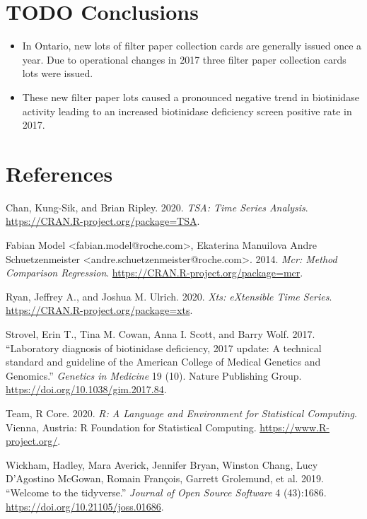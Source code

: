 \documentclass[review]{elsarticle}
\begin{document}
\section*{{\bfseries\sffamily TODO} Conclusions}
\label{sec:org73d0702}

\begin{itemize}
\item In Ontario, new lots of filter paper collection cards are generally
issued once a year. Due to operational changes in 2017 three filter
paper collection cards lots were issued.
\item These new filter paper lots caused a pronounced negative trend in
biotinidase activity leading to an increased biotinidase deficiency
screen positive rate in 2017.
\end{itemize}

\section*{References}
\label{sec:org8b4f426}
\begin{hangparas}{1.5em}{1}
\hypertarget{citeproc_bib_item_1}{Chan, Kung-Sik, and Brian Ripley. 2020. \textit{TSA: Time Series Analysis}. \href{https://CRAN.R-project.org/package=TSA}{https://CRAN.R-project.org/package=TSA}.}

\hypertarget{citeproc_bib_item_2}{Fabian Model <fabian.model@roche.com>, Ekaterina Manuilova Andre Schuetzenmeister <andre.schuetzenmeister@roche.com>. 2014. \textit{Mcr: Method Comparison Regression}. \href{https://CRAN.R-project.org/package=mcr}{https://CRAN.R-project.org/package=mcr}.}

\hypertarget{citeproc_bib_item_3}{Ryan, Jeffrey A., and Joshua M. Ulrich. 2020. \textit{Xts: eXtensible Time Series}. \href{https://CRAN.R-project.org/package=xts}{https://CRAN.R-project.org/package=xts}.}

\hypertarget{citeproc_bib_item_4}{Strovel, Erin T., Tina M. Cowan, Anna I. Scott, and Barry Wolf. 2017. “Laboratory diagnosis of biotinidase deficiency, 2017 update: A technical standard and guideline of the American College of Medical Genetics and Genomics.” \textit{Genetics in Medicine} 19 (10). Nature Publishing Group. \href{https://doi.org/10.1038/gim.2017.84}{https://doi.org/10.1038/gim.2017.84}.}

\hypertarget{citeproc_bib_item_5}{Team, R Core. 2020. \textit{R: A Language and Environment for Statistical Computing}. Vienna, Austria: R Foundation for Statistical Computing. \href{https://www.R-project.org/}{https://www.R-project.org/}.}

\hypertarget{citeproc_bib_item_6}{Wickham, Hadley, Mara Averick, Jennifer Bryan, Winston Chang, Lucy D’Agostino McGowan, Romain François, Garrett Grolemund, et al. 2019. “Welcome to the tidyverse.” \textit{Journal of Open Source Software} 4 (43):1686. \href{https://doi.org/10.21105/joss.01686}{https://doi.org/10.21105/joss.01686}.}
\end{hangparas}
\end{document}

